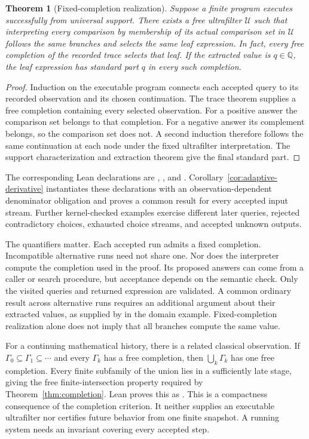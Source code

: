 \documentclass[11pt,a4paper]{article}
\theoremstyle{result}
\newtheorem{theorem}{Theorem}
\theoremstyle{definition}
\newcommand{\Q}{\mathbb{Q}}
\newcommand{\PUF}{\mathcal{U}}
\begin{document}
\begin{theorem}[Fixed-completion realization]\label{thm:program-realization}
  Suppose a finite program executes successfully from universal support. There exists a free ultrafilter $\PUF$ such that interpreting every comparison by membership of its actual comparison set in $\PUF$ follows the same branches and selects the same leaf expression. In fact, every free completion of the recorded trace selects that leaf. If the extracted value is $q\in\Q$, the leaf expression has standard part $q$ in every such completion.
\end{theorem}
\begin{proof}
  Induction on the executable program connects each accepted query to its recorded observation and its chosen continuation. The trace theorem supplies a free completion containing every selected observation. For a positive answer the comparison set belongs to that completion. For a negative answer its complement belongs, so the comparison set does not. A second induction therefore follows the same continuation at each node under the fixed ultrafilter interpretation. The support characterization and extraction theorem give the final standard part.
\end{proof}

The corresponding Lean declarations are , , and . Corollary~\ref{cor:adaptive-derivative} instantiates these declarations with an observation-dependent denominator obligation and proves a common result for every accepted input stream. Further kernel-checked examples exercise different later queries, rejected contradictory choices, exhausted choice streams, and accepted unknown outputs.

The quantifiers matter. Each accepted run admits a fixed completion. Incompatible alternative runs need not share one. Nor does the interpreter compute the completion used in the proof. Its proposed answers can come from a caller or search procedure, but acceptance depends on the semantic check. Only the visited queries and returned expression are validated. A common ordinary result across alternative runs requires an additional argument about their extracted values, as supplied by  in the domain example. Fixed-completion realization alone does not imply that all branches compute the same value.

For a continuing mathematical history, there is a related classical observation. If $\Gamma_0\subseteq\Gamma_1\subseteq\cdots$ and every $\Gamma_k$ has a free completion, then $\bigcup_k\Gamma_k$ has one free completion. Every finite subfamily of the union lies in a sufficiently late stage, giving the free finite-intersection property required by Theorem~\ref{thm:completion}. Lean proves this as . This is a compactness consequence of the completion criterion. It neither supplies an executable ultrafilter nor certifies future behavior from one finite snapshot. A running system needs an invariant covering every accepted step.
\end{document}
